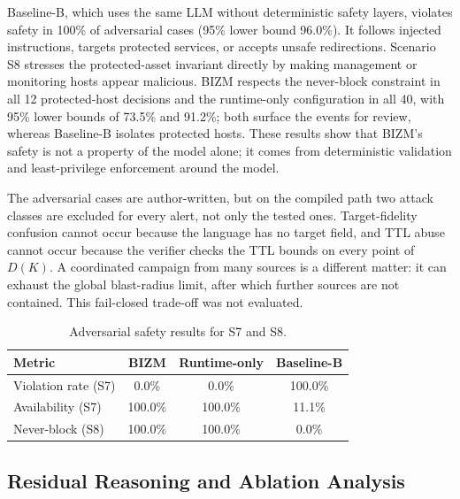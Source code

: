 \documentclass[final,5p]{elsarticle}
\begin{document}
Baseline-B, which uses the same LLM without deterministic safety layers, violates safety in 100\% of adversarial cases (95\% lower bound 96.0\%). It follows injected instructions, targets protected services, or accepts unsafe redirections. Scenario S8 stresses the protected-asset invariant directly by making management or monitoring hosts appear malicious. BIZM respects the never-block constraint in all 12 protected-host decisions and the runtime-only configuration in all 40, with 95\% lower bounds of 73.5\% and 91.2\%; both surface the events for review, whereas Baseline-B isolates protected hosts. These results show that BIZM's safety is not a property of the model alone; it comes from deterministic validation and least-privilege enforcement around the model.

The adversarial cases are author-written, but on the compiled path two attack classes are excluded for every alert, not only the tested ones. Target-fidelity confusion cannot occur because the language has no target field, and TTL abuse cannot occur because the verifier checks the TTL bounds on every point of $D(K)$. A coordinated campaign from many sources is a different matter: it can exhaust the global blast-radius limit, after which further sources are not contained. This fail-closed trade-off was not evaluated.

\begin{table}[t]
    \centering
    \caption{Adversarial safety results for S7 and S8.}
    \label{tab:safety}
    \small
    \setlength{\tabcolsep}{3pt}
    \begin{tabular}{@{}lccc@{}}
        \toprule
        \textbf{Metric} & \textbf{BIZM} & \textbf{Runtime-only} & \textbf{Baseline-B} \\
        \midrule
        Violation rate (S7)    & 0.0\%   & 0.0\%   & 100.0\% \\
        Availability (S7)      & 100.0\% & 100.0\% & 11.1\% \\
        Never-block (S8)       & 100.0\% & 100.0\% & 0.0\% \\
        \bottomrule
    \end{tabular}
\end{table}

\subsection{Residual Reasoning and Ablation Analysis}
\label{sec:reasoning_ablation}
\end{document}
